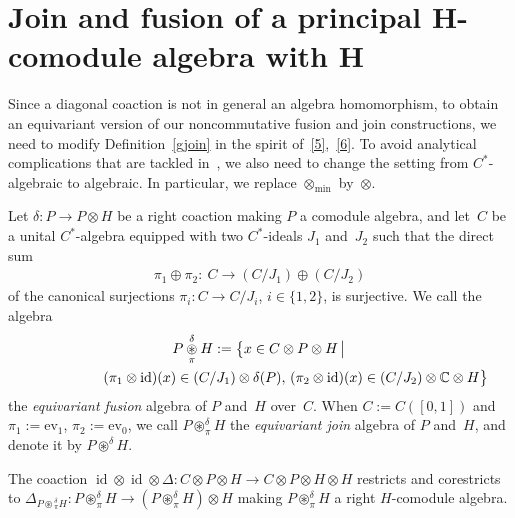 \section[Join and fusion of a principal $H$-comodule algebra with $H$]{Join and fusion of a principal $\boldsymbol{H}$-comodule algebra with $\boldsymbol{H}$}

Since a diagonal coaction is not in general an algebra homomorphism,
to obtain an equivariant version of our noncommutative fusion and join constructions,
we need to modify  Def\/inition~\ref{gjoin}
in the spirit of~\eqref{5},~\eqref{6}.
To avoid analytical complications that
are tackled in~\cite{ddhw}, we also need to change the setting from $C^*$-algebraic to algebraic. In particular,
we replace $\otimes_{\min}$ by~$\otimes$.

\begin{Definition}\label{pjoin}
Let $\delta\colon P\to P\otimes H$ be a right coaction making $P$ a comodule algebra, and
let~$C$ be a unital $C^*$-algebra equipped with two $C^*$-ideals $J_1$ and~$ J_2$
such that the direct sum
\begin{gather*}
\pi_1\oplus\pi_2\colon \ C\longrightarrow (C/J_1) \oplus (C/J_2)
\end{gather*}
of the canonical surjections $\pi_i\colon C\to C/J_i$, $i\in \{1,2\}$, is surjective. We call the algebra
\begin{gather*}
P \underset{\pi}{\overset{\delta}{\circledast}} H :=
\big\{x\in C \otimes P \otimes H \,
\big|\, \\
\hphantom{P \underset{\pi}{\overset{\delta}{\circledast}} H :=\big\{}{}
(\pi_1\otimes \operatorname{id})(x) \in (C/J_1)\otimes \delta (P) ,\,
(\pi_2\otimes \operatorname{id})(x) \in (C/J_2) \otimes \mathbb{C} \otimes H\big\}
\end{gather*}
the \emph{equivariant fusion} algebra of $P$ and~$H$ over~$C$.
When $C:=C([0,1])$  and
$\pi_1:=\mathrm{ev}_1$, $\pi_2:=\mathrm{ev}_0$,
we call $P \circledast^\delta_\pi H$ the \emph{equivariant join} algebra of $P$ and~$H$,
and denote it by $P \circledast^\delta H$.
\end{Definition}

\begin{Lemma}
The coaction $\operatorname{id}\otimes\operatorname{id}\otimes\Delta\colon
C\otimes P\otimes H\to C\otimes P\otimes H\otimes H$
restricts and corestricts to $\Delta_{P\circledast{}^\delta_\pi H}\colon P{\circledast}^\delta_\pi   H
\to (P{\circledast}^\delta_\pi H)\otimes H$ making $P{\circledast}^\delta_\pi H$
a right $H$-comodule algebra.
\end{Lemma}

